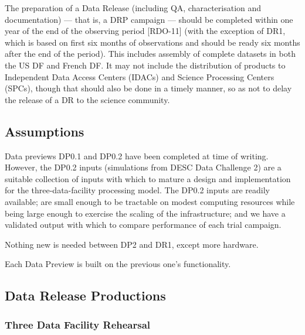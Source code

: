 The preparation of a Data Release (including QA, characterisation and documentation) --- that is, a DRP campaign --- should be completed within one year of the end of the observing period [RDO-11] (with the exception of DR1, which is based on first six months of observations and should be ready six months after the end of the period). This includes assembly of complete datasets in both the US DF and French DF. It may not include the distribution of products to Independent Data Access Centers (IDACs) and Science Processing Centers (SPCs), though that should also be done in a timely manner, so as not to delay the release of a DR to the science community.


\subsection{Assumptions}

Data previews DP0.1 and DP0.2 have been completed at time of writing. However, the DP0.2 inputs (simulations from DESC Data Challenge 2) are a suitable collection of inputs with which to mature a design and implementation for the three-data-facility processing model. The DP0.2 inputs are readily available; are small enough to be tractable on modest computing resources while being large enough to exercise the scaling of the infrastructure; and we have a validated output with which to compare performance of each trial campaign.

Nothing new is needed between \gls{DP2} and \gls{DR1}, except more
hardware.

Each Data Preview is built on the previous one's functionality.


\subsection{Data \gls{Release} Productions}

\subsubsection{Three Data Facility Rehearsal}


